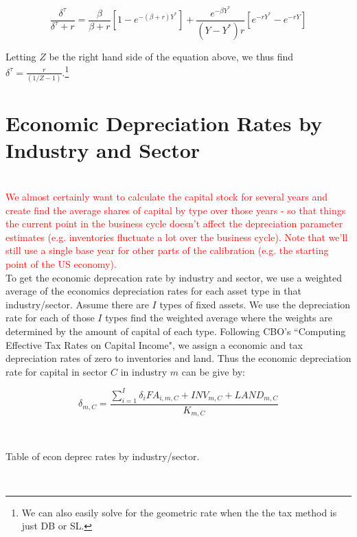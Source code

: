 \documentclass[article,11pt,letterpaper,fleqn]{article}
\theoremstyle{definition}
\numberwithin{equation}{section}
\begin{document}
\begin{equation}
\frac{\delta^{\tau}}{\delta^{\tau}+r}=\frac{\beta}{\beta+r}\left[1-e^{-(\beta+r)Y^{*}}\right]+\frac{e^{-\beta Y^{*}}}{(Y-Y^{*})r}\left[e^{-rY^{*}}-e^{-rY}\right]
\end{equation}

\noindent\noindent Letting $Z$ be the right hand side of the equation above, we thus find $\delta^{\tau}=\frac{r}{(1/Z-1)}$.\footnote{We can also easily solve for the geometric rate when the the tax method is just DB or SL.}

\section{Economic Depreciation Rates by Industry and Sector}
\label{sec:econ_rates_sector}

\ \\
\textcolor{red}{We almost certainly want to calculate the capital stock for several years and create find the average shares of capital by type over those years - so that things the current point in the business cycle doesn't affect the depreciation parameter estimates (e.g. inventories fluctuate a lot over the business cycle).  Note that we'll still use a single base year for other parts of the calibration (e.g. the starting point of the US economy).}
\ \\

To get the economic deprecation rate by industry and sector, we use a weighted average of the economics depreciation rates for each asset type in that industry/sector.  Assume there are $I$ types of fixed assets.  We use the depreciation rate for each of those $I$ types find the weighted average where the weights are determined by the amount of capital of each type.  Following CBO's ``Computing Effective Tax Rates on Capital Income", we assign a economic and tax depreciation rates of zero to inventories and land. Thus the economic depreciation rate for capital in sector $C$ in industry $m$ can be give by:

\begin{equation}
\label{eqn:econ_deprec}
\delta_{m,C}=\frac{\sum_{i=1}^{I}\delta_{i}{FA}_{i,m,C}+{INV}_{m,C}+{LAND}_{m,C}}{K_{m,C}} 
\end{equation}



 

\ \\
\begin{center}
Table of econ deprec rates by industry/sector.
\end{center}
\ \\
\end{document}
